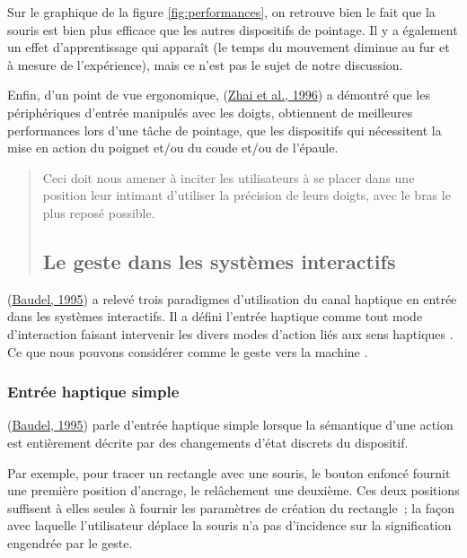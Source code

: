 \documentclass[
]{book}
\begin{document}
Sur le graphique de la figure \ref{fig:performances}, on retrouve bien le fait
que la souris est bien plus efficace que les autres dispositifs de pointage. Il
y a également un effet d'apprentissage qui apparaît (le temps du mouvement
diminue au fur et à mesure de l'expérience), mais ce n'est pas le sujet de
notre discussion.

Enfin, d'un point de vue ergonomique, (\protect\hyperlink{ref-zhai1996influence}{Zhai et al., 1996}) a démontré que les
périphériques d'entrée manipulés avec les doigts, obtiennent de meilleures
performances lors d'une tâche de pointage, que les dispositifs qui nécessitent
la mise en action du poignet et/ou du coude et/ou de l'épaule.

\begin{quote}
Ceci doit nous amener à inciter les utilisateurs
à se placer dans une position leur intimant d'utiliser la précision de
leurs doigts, avec le bras le plus reposé possible.

\hypertarget{le-geste-dans-les-systuxe8mes-interactifs}{%
\subsection{Le geste dans les systèmes interactifs}\label{le-geste-dans-les-systuxe8mes-interactifs}}
\end{quote}

(\protect\hyperlink{ref-baudel1995aspects}{Baudel, 1995}) a relevé trois
paradigmes d'utilisation du canal haptique en entrée dans les systèmes
interactifs. Il a défini l'entrée haptique comme tout mode d'interaction
faisant intervenir les divers modes d'action liés aux sens haptiques . Ce que
nous pouvons considérer comme le geste vers la machine .

\hypertarget{entruxe9e-haptique-simple}{%
\subsubsection{Entrée haptique simple}\label{entruxe9e-haptique-simple}}

(\protect\hyperlink{ref-baudel1995aspects}{Baudel, 1995}) parle d'entrée haptique
simple lorsque la sémantique d'une action est entièrement décrite par des
changements d'état discrets du dispositif.

Par exemple, pour tracer un rectangle avec une souris, le bouton enfoncé
fournit une première position d'ancrage, le relâchement une deuxième. Ces
deux positions suffisent à elles seules à fournir les paramètres de création
du rectangle~; la façon avec laquelle l'utilisateur déplace la souris n'a pas
d'incidence sur la signification engendrée par le geste.
\end{document}
